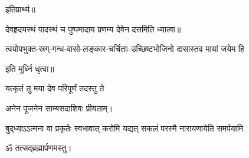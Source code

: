 इतिप्रार्थ्य॥

 देवहृदयस्थं पादस्थं च पुष्पमादाय प्रणम्य देवेन दत्तमिति ध्यात्वा॥

{त्वयोपभुक्त-स्रग्-गन्ध-वासो-लङ्कार-चर्चिताः}
{उच्छिष्टभोजिनो दासास्तव मायां जयेम हि}

इति मूर्ध्नि धृत्वा॥

{यत्कृतं तु मया देव परिपूर्णं तदस्तु ते}


अनेन पूजनेन साम्बसदाशिवः प्रीयताम्। 

{बुद्‌ध्याऽऽत्मना वा प्रकृतेः स्वभावात्}
{करोमि यद्यत् सकलं परस्मै}
{नारायणायेति समर्पयामि}


ॐ तत्सद्ब्रह्मार्पणमस्तु।\medskip
